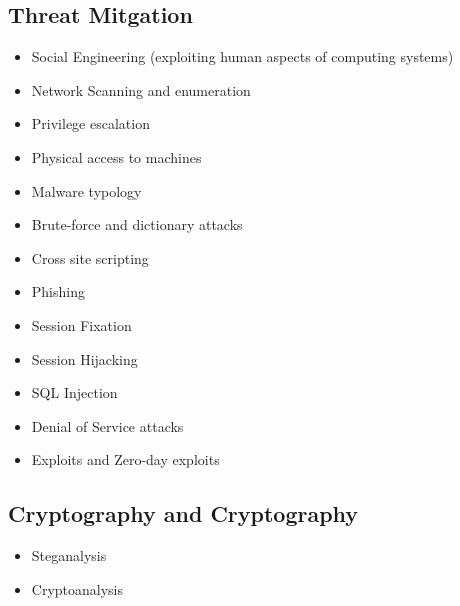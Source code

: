 \documentclass[letterpaper,10pt,english]{sphinxmanual}
\begin{document}
\subsection{Threat Mitgation}
\label{cybersecurity:threat-mitgation}\begin{itemize}
\item {} 
Social Engineering (exploiting human aspects of computing systems)

\item {} 
Network Scanning and enumeration

\item {} 
Privilege escalation

\item {} 
Physical access to machines

\item {} 
Malware typology

\item {} 
Brute-force and dictionary attacks

\item {} 
Cross site scripting

\item {} 
Phishing

\item {} 
Session Fixation

\item {} 
Session Hijacking

\item {} 
SQL Injection

\item {} 
Denial of Service attacks

\item {} 
Exploits and Zero-day exploits

\end{itemize}


\subsection{Cryptography and Cryptography}
\label{cybersecurity:cryptography-and-cryptography}\begin{itemize}
\item {} 
Steganalysis

\item {} 
Cryptoanalysis

\end{itemize}
\end{document}
